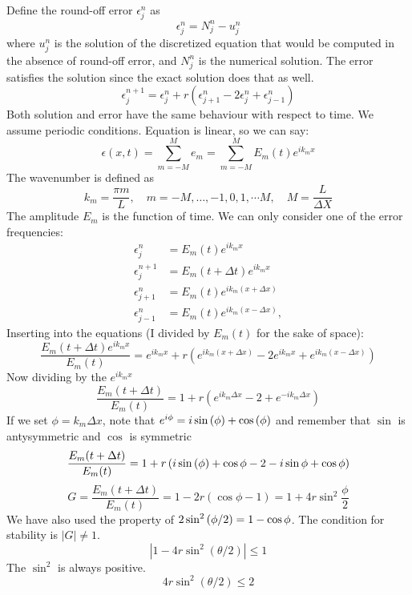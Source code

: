 \documentclass{article}
\begin{document}
Define the round-off error \(\epsilon_j^n\) as
\[
  \epsilon_j^n = N_j^n - u_j^n
\]
where \(u_j^n\) is the solution of the discretized equation that would be computed 
in the absence of round-off error, and \(N_j^n\) is the numerical solution. 
The error satisfies the solution since the exact solution does that as well.
\[
\epsilon_j^{n + 1} = \epsilon_j^n + r \left(\epsilon_{j + 1}^n - 2 \epsilon_j^n + \epsilon_{j - 1}^n \right)
\]
Both solution and error have the same behaviour with respect to time. We assume periodic 
conditions. Equation is linear, so we can say:
\[
\epsilon(x,t) = \sum_{m=-M}^{M} e_m = 
\sum_{m=-M}^{M} E_m(t) e^{{ i}  k_m x}
\]
The wavenumber is defined as 
\[
  k_m = \dfrac{\pi m}{L},\quad m = -M,\dots,-1,0,1,\dotsm M, \quad M = \dfrac{L}{\Delta X}
\]
The amplitude \(E_m\) is the function of time.
We can only consider one of the error frequencies:
\begin{align}
 \epsilon_j^n & = E_m(t) e^{ik_m x} \\
 \epsilon_j^{n+1} & = E_m(t+\Delta t)  e^{ik_m x} \\
 \epsilon_{j+1}^n & = E_m(t) e^{ik_m (x+\Delta x)} \\
 \epsilon_{j-1}^n & = E_m(t)  e^{ik_m (x-\Delta x)},
\end{align}
Inserting into the equations (I divided by \(E_m(t)\) for the sake of space):
\[
  \dfrac{E_m(t+\Delta t)  e^{ik_m x}}{E_m(t)} =  e^{ik_m x} 
+ r \left( e^{ik_m (x+\Delta x)} - 2 e^{ik_m x} +   e^{ik_m (x-\Delta x)} \right)
\]
Now dividing by the \(e^{i k_m x}\)
\[
  \dfrac{E_m(t+\Delta t) }{E_m(t)} =  1
+ r \left( e^{ik_m \Delta x} - 2  +   e^{-ik_m \Delta x} \right)
\]
If we set \(\phi = k_m \Delta x\), note that \(e^{i\phi} = i\sin\qty(\phi) + \cos\qty(\phi)\) and
remember that \(\sin\) is antysymmetric and \(\cos\) is symmetric
\[
  \dfrac{E_m(t+\Delta t) }{E_m(t)} =  1
+ r \left( i\sin\qty(\phi) + \cos\phi - 2  - i\sin\phi + \cos\phi \right)
\]
\[
  G = \dfrac{E_m(t+\Delta t) }{E_m(t)} =  1 - 2r \left(\cos\phi - 1\right) 
  = 1 + 4r\sin^2\dfrac{\phi}{2}
\]
We have also used the property of \(2\sin^2\qty(\phi/2) = 1-\cos\phi\). 
The condition for stability is \(|G| \neq 1\).
\[
   \left| 1 - 4 r \sin^2 (\theta /2) \right| \leq 1
\]
The \(\sin^2\) is always positive. 
\[
   4 r \sin^2 (\theta /2) \leq 2
\]
\end{document}
